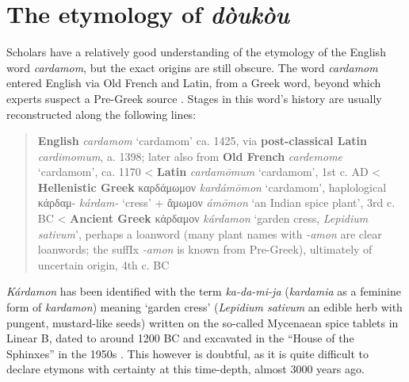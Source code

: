 \documentclass[12pt]{article}
\newcommand{\lb}[1]{\linearbfont{#1}\rmfamily}
\begin{document}

\section{The etymology of \textit{dòukòu}}\label{sec:etymology}

Scholars have a relatively good understanding of the etymology of the English word \textit{cardamom}, but the exact origins are still obscure. The word \textit{cardamom} entered English via Old French and Latin, from a Greek word, beyond which experts suspect a Pre-Greek source \parencite{beekes_2010_etymological}. Stages in this word's history are usually reconstructed along the following lines:

\begin{quote}
    \textbf{English} \textit{cardamom} `cardamom' ca. 1425, via \textbf{post-classical Latin} \textit{cardimomum}, a. 1398; 
    later also from \textbf{Old French} \textit{cardemome} `cardamom', ca. 1170
    < \textbf{Latin} \textit{cardamōmum} `cardamom', 1st c. AD
    < \textbf{Hellenistic Greek} {καρδάμωμον} \textit{kardámōmon} `cardamom', haplological κάρδαμ- \textit{kárdam-} `cress' + ἄμωμον \textit{ámōmon} `an Indian spice plant', 3rd c. BC
    < \textbf{Ancient Greek} {κάρδαμον} \textit{kárdamon} `garden cress, \textit{Lepidium sativum}', perhaps a loanword (many plant names with \textit{-amon} are clear loanwords; the suffIx \textit{-amon} is known from Pre-Greek), ultimately of uncertain origin, 4th c. BC 
    \parencites[s.v. cardamom]{oed}[s.v. cardamome]{tlfi}[s.v. cardamomum]{lewis_1879_latin}[s.v. καρδάμωμον]{liddell_1940_greekenglish}[s.v. κάρδαμον]{liddell_1940_greekenglish}[644]{beekes_2010_etymological}
\end{quote}

\textit{Kárdamon} has been identified with the term \lb{𐀏𐀅𐀖𐀊} \textit{ka-da-mi-ja} (\textit{kardamia} as a feminine form of \textit{kardamon}) meaning `garden cress' (\textit{Lepidium sativum} an edible herb with pungent, mustard-like seeds) written on the so-called Mycenaean spice tablets in Linear B, dated to around 1200 BC and excavated in the ``House of the Sphinxes'' in the 1950s \parencite[107]{bennett_1958_mycenae}. This however is doubtful, as it is quite difficult to declare etymons with certainty at this time-depth, almost 3000 years ago.
\end{document}
